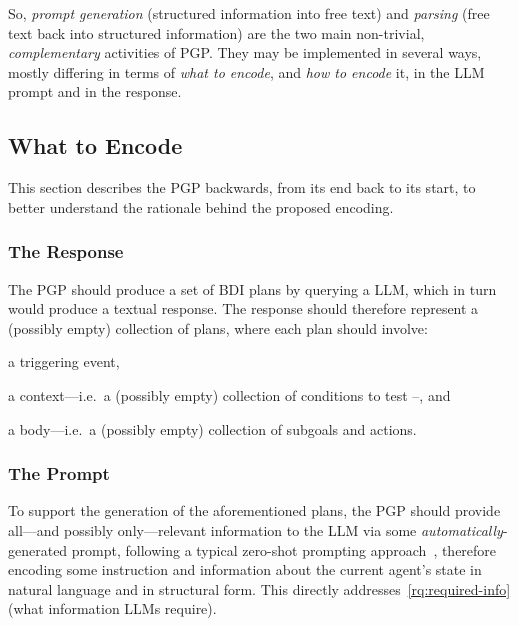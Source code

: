 \documentclass[12pt,a4paper,openright,twoside]{book}
\begin{document}
So, \emph{prompt generation} (structured information into free text) and  \emph{parsing} (free text back into structured information) are the two main non-trivial, \emph{complementary} activities of \ac{PGP}.
%
They may be implemented in several ways, mostly differing in terms of \emph{what to encode}, and \emph{how to encode} it, in the \ac{LLM} prompt and in the response.

\subsection{What to Encode}\label{sec:pgp-encoding}

This section describes the \ac{PGP} backwards, from its end back to its start, to better understand the rationale behind the proposed encoding.

\subsubsection{The Response}
%
The \ac{PGP} should produce a set of \ac{BDI} plans by querying a \ac{LLM}, which in turn would produce a textual response.
%
The response should therefore represent a (possibly empty) collection of plans, where each plan should involve:
%
\begin{inlinelist}
    \item a triggering event,
    \item a context---i.e.\ a (possibly empty) collection of conditions to test --, and
    \item a body---i.e.\ a (possibly empty) collection of subgoals and actions.
\end{inlinelist}

\subsubsection{The Prompt}

To support the generation of the aforementioned plans, the \ac{PGP} should provide all---and possibly only---relevant information to the \ac{LLM} via some \emph{automatically}-generated prompt, following a typical zero-shot prompting approach~\cite{KojimaGRMI22}, therefore encoding some instruction and information about the current agent's state in natural language and in structural form. This directly addresses~\cref{rq:required-info} (what information LLMs require).
\end{document}
